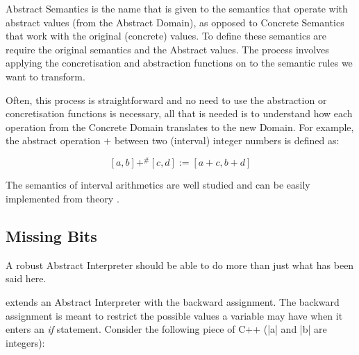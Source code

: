 Abstract Semantics is the name that is given to the semantics that operate with abstract
values (from the Abstract Domain), as opposed to Concrete Semantics that work with the
original (concrete) values. To define these semantics are require the original
semantics and the Abstract values. The process involves applying the concretisation and
abstraction functions on to the semantic rules we want to transform.

Often, this process is straightforward and no need to use the abstraction or
concretisation functions is necessary, all that is needed is to understand how each
operation from the Concrete Domain translates to the new Domain. For example, the
abstract operation $+$ between two (interval) integer numbers is defined as:

\[[a, b] +^{\#} [c, d] := [a+c, b+d]\]

The semantics of interval arithmetics are well studied and can be easily implemented from
theory \autocite{hayes_interval_2003}.


%
%
%
%

\subsection{Missing Bits}\label{missing-bits}

A robust Abstract Interpreter should be able to do more than just what
has been said here.

\textcite{mine_weakly_2004} extends an Abstract Interpreter with the
backward assignment. The backward assignment is meant to restrict the
possible values a variable may have when it enters an \emph{if}
statement. Consider the following piece of C++ (\pycode|a| and
\pycode|b| are integers):

